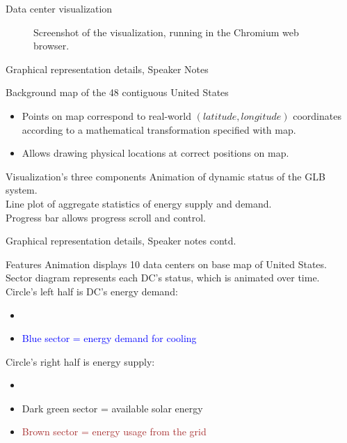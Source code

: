 \documentclass[xcolor=dvipsnames]{beamer}
\begin{document}
\begin{frame}{Data center visualization}

\begin{figure}
\centering
{}
\caption{Screenshot of the visualization, running in the Chromium web browser.}
\end{figure}

\end{frame}

\begin{frame}{Graphical representation details, Speaker Notes}

	\begin{block}{Background map of the 48 contiguous United States}
		\begin{itemize} 
	\item 	Points on map correspond to real-world $(latitude, longitude)$ coordinates according to a mathematical transformation specified with map. 
	\item 	Allows drawing physical locations at correct positions on map.
		\end{itemize}
	\end{block}
\vspace{-3mm}
	\begin{block}{Visualization's three components}
	Animation of dynamic status of the GLB system. \\
	Line plot of aggregate statistics of energy supply and demand. \\  
	Progress bar allows progress scroll and control.
	\end{block}
\end{frame}

\begin{frame}{Graphical representation details, Speaker notes contd.}
	\begin{block}{Features}
	Animation displays 10 data centers on base map of United States. \\
	Sector diagram represents each DC's status, which is animated over time. \\
	Circle's left half is DC's energy demand: 
		\begin{itemize}
		\item{\textcolor{yellow}{}}
		\item{\textcolor{blue}{Blue sector = energy demand for cooling} }
		\end{itemize}
	Circle's right half is energy supply: 
		\begin{itemize}
		\item{\textcolor{green}{}}
		\item{\textcolor{dgreen}{Dark green sector = available solar energy}}
		\item{\textcolor{brown}{Brown sector = energy usage from the grid}}
		\end{itemize} 
           \end{block} 
\end{frame}
\end{document}
